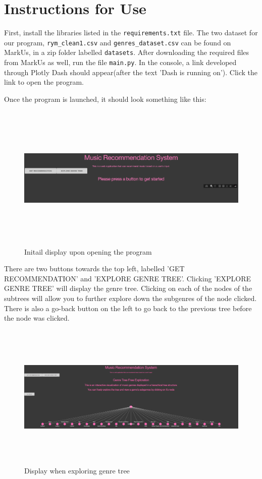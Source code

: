 \documentclass[fontsize=11pt]{article}
\begin{document}
\section*{Instructions for Use}

First, install the libraries listed in the \texttt{requirements.txt} file. The two dataset for our program, \texttt{rym\_clean1.csv} and \texttt{genres\_dataset.csv} can be found on MarkUs, in a zip folder labelled \texttt{datasets}. After downloading the required files from MarkUs as well, run the file \texttt{main.py}. In the console, a link developed through Plotly Dash should appear(after the text 'Dash is running on'). Click the link to open the program.

Once the program is launched, it should look something like this: 

\begin{figure}[h]
    \centering
    \includegraphics[height=7cm, width=18cm]{examplelaunch.png}
    \caption{Initail display upon opening the program}
    \label{fig:my_label}
\end{figure}

There are two buttons towards the top left, labelled 'GET RECOMMENDATION' and 'EXPLORE GENRE TREE'. Clicking 'EXPLORE GENRE TREE' will display the genre tree. Clicking on each of the nodes of the subtrees will allow you to further explore down the subgenres of the node clicked. There is also a go-back button on the left to go back to the previous tree before the node was clicked. 

\begin{figure}[h]
    \centering
    \includegraphics[height=7cm, width=18cm]{examplegenretree.png}
    \caption{Display when exploring genre tree}
    \label{fig:my_label}
\end{figure}
\end{document}
